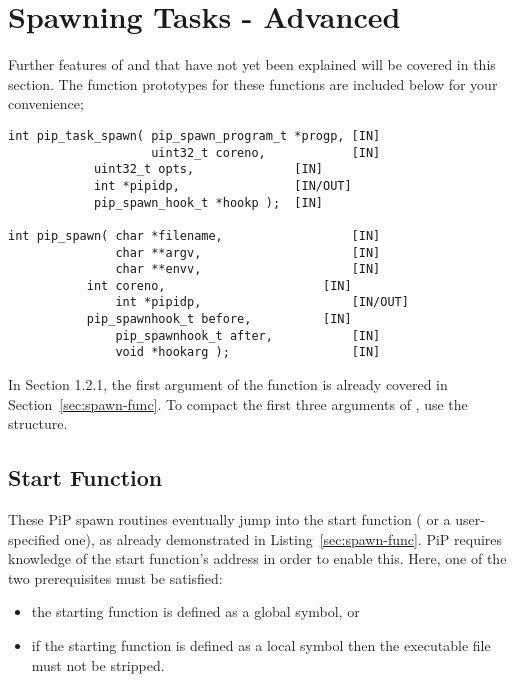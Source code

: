 
\section{Spawning Tasks - Advanced}\label{sec:spawn-adv}

Further features of  and 
that have not yet been explained will be covered in this section. The
function prototypes for these functions are included below for your
convenience;

\begin{lstlisting}[frame=tb]
int pip_task_spawn( pip_spawn_program_t *progp, [IN]
                    uint32_t coreno,            [IN]
		    uint32_t opts,              [IN]
		    int *pipidp,                [IN/OUT]
		    pip_spawn_hook_t *hookp );  [IN]

int pip_spawn( char *filename,                  [IN]
               char **argv,                     [IN]
               char **envv,                     [IN]
	       int coreno,                      [IN]
               int *pipidp,                     [IN/OUT]
	       pip_spawnhook_t before,          [IN]
               pip_spawnhook_t after,           [IN]
               void *hookarg );                 [IN]
\end{lstlisting}

In Section 1.2.1, the first argument of the 
function is already covered in Section~\ref{sec:spawn-func}. To
compact the first three arguments of , use the
 structure. 

\subsection{Start Function}

These PiP spawn routines eventually jump into the start function
({\main} or a user-specified one), as already demonstrated in
Listing~\ref{sec:spawn-func}. PiP requires knowledge of the start
function's address in order to enable this. Here, one of the two
prerequisites must be satisfied: 

\begin{itemize}
\item the starting function is defined as a global symbol, or
\item if the starting function is defined as a local symbol then the
  executable file must not be stripped.
\end{itemize}


